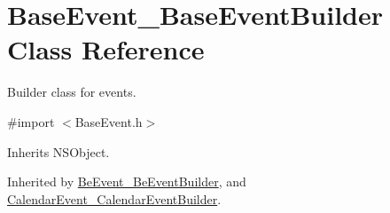 \hypertarget{interface_base_event___base_event_builder}{}\section{Base\+Event\+\_\+\+Base\+Event\+Builder Class Reference}
\label{interface_base_event___base_event_builder}


Builder class for events.  




{\ttfamily \#import $<$Base\+Event.\+h$>$}



Inherits N\+S\+Object.



Inherited by \hyperlink{interface_be_event___be_event_builder}{Be\+Event\+\_\+\+Be\+Event\+Builder}, and \hyperlink{interface_calendar_event___calendar_event_builder}{Calendar\+Event\+\_\+\+Calendar\+Event\+Builder}.

